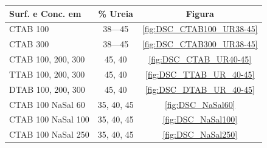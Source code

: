     \begin{table}[H]
            {%
            \begin{tabular}{l c c}
                \toprule
				Surf. e Conc. em \mM             & \% Ureia		 & Figura 			\\
    			\midrule
				CTAB 100	                     & 38---45		 & \ref{fig:DSC_CTAB100_UR38-45}\\
				CTAB 300	                     & 38---45		 & \ref{fig:DSC_CTAB300_UR38-45}\\
				CTAB 100, 200, 300	             & 45, 40	     & \ref{fig:DSC_CTAB_UR40-45}	\\
				TTAB 100, 200, 300	             & 45, 40	     & \ref{fig:DSC_TTAB_UR_40-45}	\\
				DTAB 100, 200, 300	             & 45, 40	     & \ref{fig:DSC_DTAB_UR_40-45}	\\
    			\midrule
				CTAB 100 NaSal 60	             & 35, 40, 45	 & \ref{fig:DSC_NaSal60}		\\
				CTAB 100 NaSal 100	             & 35, 40, 45	 & \ref{fig:DSC_NaSal100}	\\
				CTAB 100 NaSal 250	             & 35, 40, 45	 & \ref{fig:DSC_NaSal250}	\\
    			\bottomrule
            \end{tabular}%
            }{}
    \end{table}
	


